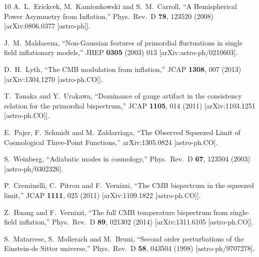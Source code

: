 \documentclass[12pt]{article}
\numberwithin{equation}{section}
\begin{document}
{\begin{thebibliography}{10}
  A.~L.~Erickcek, M.~Kamionkowski and S.~M.~Carroll,
  ``A Hemispherical Power Asymmetry from Inflation,''
  Phys.\ Rev.\ D {\bf 78}, 123520 (2008)
  [arXiv:0806.0377 [astro-ph]].

  J.~M.~Maldacena,
  ``Non-Gaussian features of primordial fluctuations in single field
  inflationary models,''
  JHEP {\bf 0305} (2003) 013
  [arXiv:astro-ph/0210603].

  D.~H.~Lyth,
  ``The CMB modulation from inflation,''
  JCAP {\bf 1308}, 007 (2013)
  [arXiv:1304.1270 [astro-ph.CO]].

  T.~Tanaka and Y.~Urakawa,
  ``Dominance of gauge artifact in the consistency relation for the primordial bispectrum,''
  JCAP {\bf 1105}, 014 (2011)
  [arXiv:1103.1251 [astro-ph.CO]].

  E.~Pajer, F.~Schmidt and M.~Zaldarriaga,
  ``The Observed Squeezed Limit of Cosmological Three-Point Functions,''
  arXiv:1305.0824 [astro-ph.CO].

  S.~Weinberg,
  ``Adiabatic modes in cosmology,''
  Phys.\ Rev.\ D {\bf 67}, 123504 (2003)
  [astro-ph/0302326].

  P.~Creminelli, C.~Pitrou and F.~Vernizzi,
  ``The CMB bispectrum in the squeezed limit,''
  JCAP {\bf 1111}, 025 (2011)
  [arXiv:1109.1822 [astro-ph.CO]].

  Z.~Huang and F.~Vernizzi,
  ``The full CMB temperature bispectrum from single-field inflation,''
  Phys.\ Rev.\ D {\bf 89}, 021302 (2014)
  [arXiv:1311.6105 [astro-ph.CO]].

  S.~Matarrese, S.~Mollerach and M.~Bruni,
  ``Second order perturbations of the Einstein-de Sitter universe,''
  Phys.\ Rev.\ D {\bf 58}, 043504 (1998)
  [astro-ph/9707278].


\end{thebibliography}}
\end{document}
